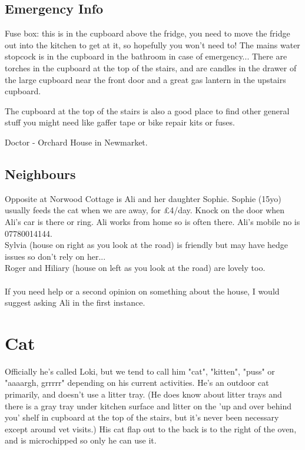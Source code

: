 \documentclass[11pt]{article}
\begin{document}
\subsection*{Emergency Info}
Fuse box: this is in the cupboard above the fridge, you need to move the fridge out into the kitchen to get at it, so hopefully you won't need to! The mains water stopcock is in the cupboard in the bathroom in case of emergency...  There are torches in the cupboard at the top of the stairs, and are candles in the drawer of the large cupboard near the front door and a great gas lantern in the upstairs cupboard.

The cupboard at the top of the stairs is also a good place to find other general stuff you might need like gaffer tape or bike repair kits or fuses. 

Doctor - Orchard House in Newmarket. 

\subsection*{Neighbours}
Opposite at Norwood Cottage is Ali and her daughter Sophie.  Sophie (15yo) usually feeds the cat when we are away, for £4/day.  Knock on the door when Ali's car is there or ring.  Ali works from home so is often there.  Ali's mobile no is 07780014144.
\\Sylvia (house on right as you look at the road) is friendly but may have hedge issues so don't rely on her...
\\Roger and Hiliary (house on left as you look at the road) are lovely too.  
\\
\\If you need help or a second opinion on something about the house, I would suggest asking Ali in the first instance.  

\newpage 
\section{Cat}

Officially he's called Loki, but we tend to call him "cat", "kitten", "puss" or "aaaargh, grrrrr" depending on his current activities. He's an outdoor cat primarily, and doesn't use a litter tray. (He does know about litter trays and there is a gray tray under kitchen surface and litter on the 'up and over behind you' shelf in cupboard at the top of the stairs, but it's never been necessary except around vet visits.)  His cat flap out to the back is to the right of the oven, and is microchipped so only he can use it. 
\end{document}
